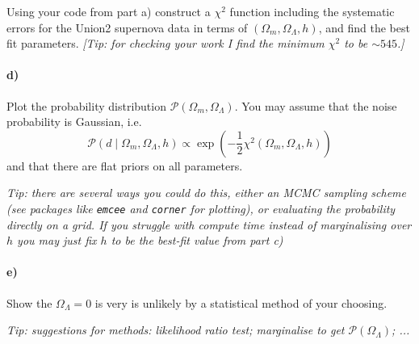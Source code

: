 \documentclass[12pt]{article}
\begin{document}
Using your code from part a) construct a $\chi^2$ function including the systematic errors for the Union2 supernova data in terms of $(\Omega_m, \Omega_\Lambda, h)$, and find the best fit parameters. \emph{[Tip: for checking your work I find the minimum $\chi^2$ to be $\sim 545$.]}

\paragraph{d)}
Plot the probability distribution $\mathcal{P}(\Omega_m, \Omega_\Lambda)$. You may assume that the noise probability is Gaussian, i.e.
\begin{equation}
\mathcal{P}(d \mid \Omega_m, \Omega_\Lambda, h) \propto \exp{\left(-\frac{1}{2}\chi^2(\Omega_m, \Omega_\Lambda, h)\right)}
\end{equation}
and that there are flat priors on all parameters.

\emph{Tip: there are several ways you could do this, either an MCMC sampling scheme (see packages like \texttt{emcee} and \texttt{corner} for plotting), or evaluating the probability directly on a grid. If you struggle with compute time instead of marginalising over $h$ you may just fix $h$ to be the best-fit value from part c)}

\paragraph{e)}
Show the $\Omega_\Lambda = 0$ is very is unlikely by a statistical method of your choosing.

\emph{Tip: suggestions for methods: likelihood ratio test; marginalise to get $\mathcal{P}(\Omega_\Lambda)$; ...}
\end{document}
